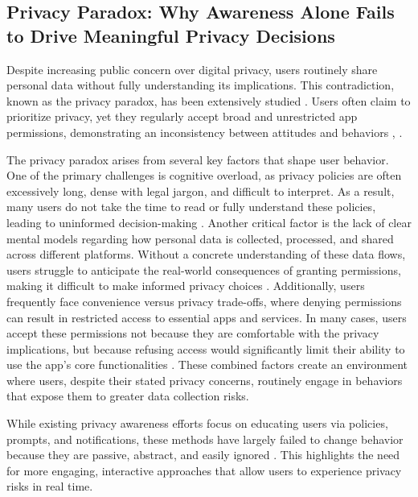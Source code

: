 \documentclass[acmlarge, nonacm]{acmart}
\begin{document}
\subsection{Privacy Paradox: Why Awareness Alone Fails to Drive Meaningful Privacy Decisions}

Despite increasing public concern over digital privacy, users routinely share personal data without fully understanding its implications. This contradiction, known as the privacy paradox, has been extensively studied \cite{Gerber2018Explaining}. Users often claim to prioritize privacy, yet they regularly accept broad and unrestricted app permissions, demonstrating an inconsistency between attitudes and behaviors \cite{barth2017privacy}, \cite{baruh2017big}.

The privacy paradox arises from several key factors that shape user behavior. One of the primary challenges is cognitive overload, as privacy policies are often excessively long, dense with legal jargon, and difficult to interpret. As a result, many users do not take the time to read or fully understand these policies, leading to uninformed decision-making \cite{Obar2018The}. Another critical factor is the lack of clear mental models regarding how personal data is collected, processed, and shared across different platforms. Without a concrete understanding of these data flows, users struggle to anticipate the real-world consequences of granting permissions, making it difficult to make informed privacy choices \cite{balebako2022nudging}. Additionally, users frequently face convenience versus privacy trade-offs, where denying permissions can result in restricted access to essential apps and services. In many cases, users accept these permissions not because they are comfortable with the privacy implications, but because refusing access would significantly limit their ability to use the app’s core functionalities \cite{Fleischhauer2022Paradox}. These combined factors create an environment where users, despite their stated privacy concerns, routinely engage in behaviors that expose them to greater data collection risks.

While existing privacy awareness efforts focus on educating users via policies, prompts, and notifications, these methods have largely failed to change behavior because they are passive, abstract, and easily ignored \cite{feng2021yaodesign}. This highlights the need for more engaging, interactive approaches that allow users to experience privacy risks in real time.
\end{document}

